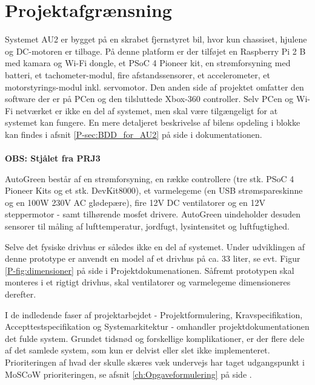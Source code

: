 \chapter{Projektafgrænsning} \label{ch:Projektafgraensning}

Systemet AU2 er bygget på en skrabet fjernstyret bil, hvor kun chassiset, hjulene og DC-motoren er tilbage. På denne platform er der tilføjet en Raspberry Pi 2 B med kamara og Wi-Fi dongle, et PSoC 4 Pioneer kit, en strømforsyning med batteri, et tachometer-modul, fire afstandssensorer, et accelerometer, et motorstyrings-modul inkl. servomotor. Den anden side af projektet omfatter den software der er på PCen og den tilsluttede Xbox-360 controller. Selv PCen og Wi-Fi netværket er ikke en del af systemet, men skal være tilgængeligt for at systemet kan fungere. En mere detaljeret beskrivelse af bilens opdeling i blokke kan findes i afsnit \ref{P-sec:BDD_for_AU2}  på side \pageref{P-sec:BDD_for_AU2} i dokumentationen.\\\\


\textbf{OBS: Stjålet fra PRJ3}

AutoGreen består af en strømforsyning, en række controllere (tre stk. PSoC 4 Pioneer Kits og et stk. DevKit8000), et varmelegeme (en USB strømspareskinne og en 100W 230V AC glødepære), fire 12V DC ventilatorer og en 12V steppermotor - samt tilhørende mosfet drivere. 
AutoGreen uindeholder desuden sensorer til måling af lufttemperatur, jordfugt, lysintensitet og luftfugtighed.

Selve det fysiske drivhus er således ikke en del af systemet. 
Under udviklingen af denne prototype er anvendt en model af et drivhus på ca. 33 liter, se evt. Figur \ref{P-fig:dimensioner} på side \pageref{P-fig:dimensioner} i Projektdokumenationen. 
Såfremt prototypen skal monteres i et rigtigt drivhus, skal ventilatorer og varmelegeme dimensioneres derefter.

\mbox{}

I de indledende faser af projektarbejdet - Projektformulering, Kravspecifikation, Accepttestspecifikation og Systemarkitektur - omhandler projektdokumentationen det fulde system.
Grundet tidsnød og forskellige komplikationer, er der flere dele af det samlede system, som kun er delvist eller slet ikke implementeret.
Prioriteringen af hvad der skulle skæres væk undervejs har taget udgangspunkt i MoSCoW prioriteringen, se afsnit \ref{ch:Opgaveformulering}  på side \pageref{ch:Opgaveformulering}.

